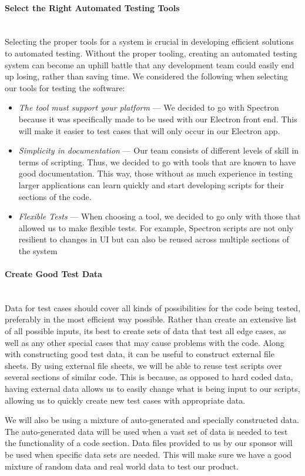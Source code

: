 \paragraph{Select the Right Automated Testing Tools} \mbox{}\\[\paragraphheaderspace]
Selecting the proper tools for a system is crucial in developing efficient solutions to automated testing. Without the proper tooling, creating an automated testing system can become an uphill battle that any development team could easily end up losing, rather than saving time. We considered the following when selecting our tools for testing the software:
\begin{itemize}
  \item \textit{The tool must support your platform} --- We decided to go with Spectron because it was specifically made to be used with our Electron front end. This will make it easier to test cases that will only occur in our Electron app.
  \item \textit{Simplicity in documentation} --- Our team consists of different levels of skill in terms of scripting. Thus, we decided to go with tools that are known to have good documentation. This way, those without as much experience in testing larger applications can learn quickly and start developing scripts for their sections of the code.
  \item \textit{Flexible Tests} --- When choosing a tool, we decided to go only with those that allowed us to make flexible tests. For example, Spectron scripts are not only resilient to changes in UI but can also be reused across multiple sections of the system
\end{itemize}

\paragraph{Create Good Test Data} \mbox{}\\[\paragraphheaderspace]
Data for test cases should cover all kinds of possibilities for the code being tested, preferably in the most efficient way possible. Rather than create an extensive list of all possible inputs, it\textquotesingle s best to create sets of data that test all edge cases, as well as any other special cases that may cause problems with the code. Along with constructing good test data, it can be useful to construct external file sheets. By using external file sheets, we will be able to reuse test scripts over several sections of similar code. This is because, as opposed to hard coded data, having external data allows us to easily change what is being input to our scripts, allowing us to quickly create new test cases with appropriate data.\par
We will also be using a mixture of auto-generated and specially constructed data. The auto-generated data will be used when a vast set of data is needed to test the functionality of a code section. Data files provided to us by our sponsor will be used when specific data sets are needed. This will make sure we have a good mixture of random data and real world data to test our product.

